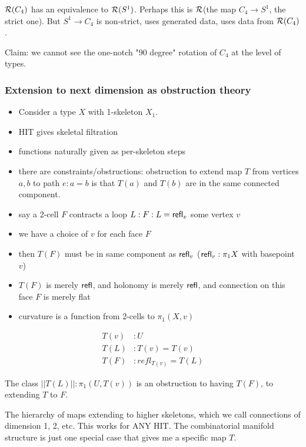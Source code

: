 \documentclass[12pt,fleqn]{article}
\begin{document}
\( \mathcal{R}(C_4) \) has an equivalence to \( \mathcal{R}(S^1) \). Perhaps this is \( \mathcal{R} \)(the map \( C_4\to S^1 \), the strict one). But \( S^1\to C_4 \) is non-strict, uses generated data, uses data from \( \mathcal{R}(C_4) \).

Claim: we cannot see the one-notch "90 degree" rotation of \( C_4 \) at the level of types.

\subsubsection{Extension to next dimension as obstruction theory}

\begin{itemize}
\item Consider a type \( X \) with 1-skeleton \( X_1 \).
\item HIT gives skeletal filtration
\item functions naturally given as per-skeleton steps
\item there are constraints/obstructions: obstruction to extend map \( T \) from vertices \( a, b \) to path \( e:a=b \) is that \( T(a) \) and \( T(b) \) are in the same connected component.
\item say a 2-cell \( F \) contracts a loop \( L: F:L=\mathsf{refl}_v \) some vertex \( v \)
\item we have a choice of \( v \) for each face \( F \)
\item then \( T(F) \) must be in same component as \( \mathsf{refl}_v \) (\( \mathsf{refl}_v:\pi_1 X \) with basepoint \( v \))
\item \( T(F) \) is merely \( \mathsf{refl} \), and holonomy is merely \( \mathsf{refl} \), and connection on this face \( F \) is merely flat
\item curvature is a function from 2-cells to \( \pi_1(X,v) \)
\end{itemize}

\begin{align*}
T(v)&:U\\
T(L)&:T(v)=T(v)\\
T(F)&:refl_{T(v)}=T(L)
\end{align*}

The class \( ||T(L)||:\pi_1(U,T(v)) \) is an obstruction to having \( T(F) \), to extending \( T \) to \( F \).

The hierarchy of maps extending to higher skeletons, which we call connections of dimension 1, 2, etc. This works for ANY HIT. The combinatorial manifold structure is just one special case that gives me a specific map \( T \).
\end{document}
